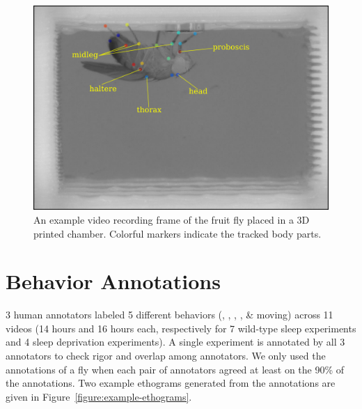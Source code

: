 \begin{figure}[htb!]
	\centering
	\includegraphics[width=0.9\linewidth]{figures/FlyTrackedBodyParts.png}
	\caption[An example frame of the fruit fly placed in a 3D printed chamber.] {An example video recording frame of the fruit fly placed in a 3D printed chamber. Colorful markers indicate the tracked body parts.\label{figure:example-labeled-frame}}
\end{figure}

\section{Behavior Annotations}\label{section:behavior-annotations}
3 human annotators labeled 5 different behaviors (\Feeding, \Grooming, \HaltereSwitch, \ProboscisPumping,  \PosturalAdjustment \& moving) across 11 videos (14 hours and 16 hours each, respectively for 7 wild-type sleep experiments and 4 sleep deprivation experiments).
A single experiment is annotated by all 3 annotators to check rigor and overlap among annotators.
We only used the annotations of a fly when each pair of annotators agreed at least on the 90\% of the annotations.
Two example ethograms generated from the annotations are given in Figure~\ref{figure:example-ethograms}.

